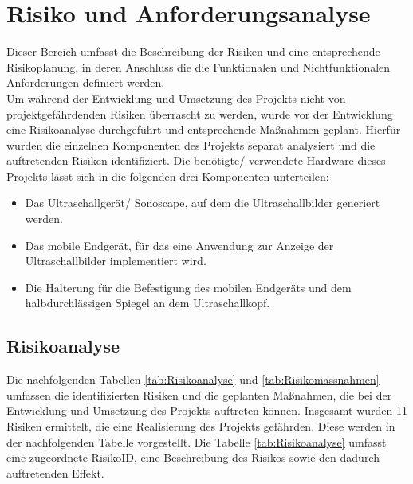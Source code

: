 \chapter{Risiko und Anforderungsanalyse}
Dieser Bereich umfasst die Beschreibung der Risiken und eine entsprechende Risikoplanung, in deren Anschluss die die Funktionalen und Nichtfunktionalen Anforderungen definiert werden.\\
Um während der Entwicklung und Umsetzung des Projekts nicht von projektgefährdenden Risiken überrascht zu werden, wurde vor der Entwicklung eine Risikoanalyse durchgeführt und entsprechende Maßnahmen geplant. Hierfür wurden die einzelnen Komponenten des Projekts separat analysiert und die auftretenden Risiken identifiziert. Die benötigte/ verwendete Hardware dieses Projekts lässt sich in die folgenden drei Komponenten unterteilen:
\\
\begin{minipage}{\textwidth}
\begin{itemize}
\item Das Ultraschallgerät/ Sonoscape, auf dem die Ultraschallbilder generiert werden.
\item Das mobile Endgerät, für das eine Anwendung zur Anzeige der Ultraschallbilder implementiert wird.
\item Die Halterung für die Befestigung des mobilen Endgeräts und dem halbdurchlässigen Spiegel an dem Ultraschallkopf.
\end{itemize}
\end{minipage}

\section{Risikoanalyse}
Die nachfolgenden Tabellen \ref{tab:Risikoanalyse} und \ref{tab:Risikomassnahmen} umfassen die identifizierten Risiken und die geplanten Maßnahmen, die bei der Entwicklung und Umsetzung des Projekts auftreten können. Insgesamt wurden 11 Risiken ermittelt, die eine Realisierung des Projekts gefährden. Diese werden in der nachfolgenden Tabelle vorgestellt. Die Tabelle \ref{tab:Risikoanalyse} umfasst eine zugeordnete RisikoID, eine Beschreibung des Risikos sowie den dadurch auftretenden Effekt.

